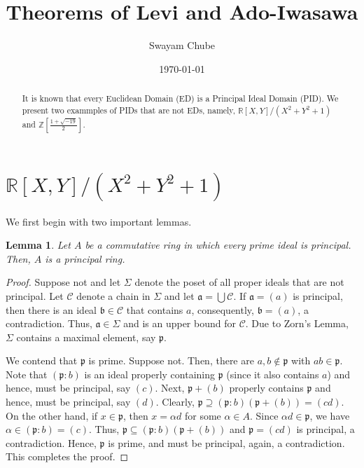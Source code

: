 \documentclass[12pt]{article}
\title{Theorems of Levi and Ado-Iwasawa}
\author{Swayam Chube}
\date{\today}
\theoremstyle{thmstyle}
\newtheorem{lemma}[theorem]{Lemma}
\theoremstyle{defstyle}
\newcommand{\R}{\mathbb{R}}
\newcommand{\Z}{\mathbb{Z}}
\newcommand{\fraka}{\mathfrak{a}} %
\newcommand{\frakb}{\mathfrak{b}} %
\newcommand{\frakp}{\mathfrak{p}} %
\begin{document}
\maketitle
\begin{abstract}
    It is known that every Euclidean Domain (ED) is a Principal Ideal Domain (PID). We present two exammples of PIDs that are not EDs, namely, $\R[X, Y]/(X^2 + Y^2 + 1)$ and $\Z\left[\frac{1 + \sqrt{-19}}{2}\right]$.
\end{abstract}

\section{\texorpdfstring{$\R[X, Y]/(X^2 + Y^2 + 1)$}{}}

We first begin with two important lemmas.

\begin{lemma}
    Let $A$ be a commutative ring in which every prime ideal is principal. Then, $A$ is a principal ring.
\end{lemma}
\begin{proof}
    Suppose not and let $\Sigma$ denote the poset of all proper ideals that are not principal. Let $\mathscr C$ denote a chain in $\Sigma$ and let $\fraka = \bigcup\mathscr C$. If $\fraka = (a)$ is principal, then there is an ideal $\frakb\in\mathscr C$ that contains $a$, consequently, $\frakb = (a)$, a contradiction. Thus, $\fraka\in\Sigma$ and is an upper bound for $\mathscr C$. Due to Zorn's Lemma, $\Sigma$ contains a maximal element, say $\frakp$.

    We contend that $\frakp$ is prime. Suppose not. Then, there are $a,b\notin\frakp$ with $ab\in\frakp$. Note that $(\frakp : b)$ is an ideal properly containing $\frakp$ (since it also contains $a$) and hence, must be principal, say $(c)$. Next, $\frakp + (b)$ properly contains $\frakp$ and hence, must be principal, say $(d)$. Clearly, $\frakp\supseteq(\frakp : b)(\frakp + (b)) = (cd)$. On the other hand, if $x\in\frakp$, then $x = \alpha d$ for some $\alpha\in A$. Since $\alpha d\in\frakp$, we have $\alpha\in (\frakp : b) = (c)$. Thus, $\frakp\subseteq(\frakp : b)(\frakp + (b))$ and $\frakp = (cd)$ is principal, a contradiction. Hence, $\frakp$ is prime, and must be principal, again, a contradiction. This completes the proof.
\end{proof}
\end{document}
